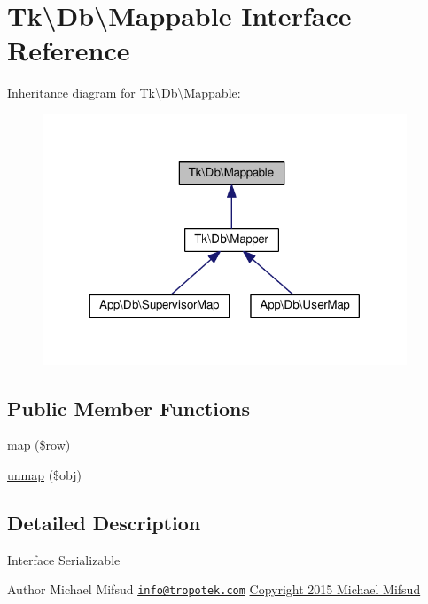 \hypertarget{interfaceTk_1_1Db_1_1Mappable}{\section{Tk\textbackslash{}Db\textbackslash{}Mappable Interface Reference}
\label{interfaceTk_1_1Db_1_1Mappable}
}


Inheritance diagram for Tk\textbackslash{}Db\textbackslash{}Mappable\+:\nopagebreak
\begin{figure}[H]
\begin{center}
\leavevmode
\includegraphics[width=308pt]{interfaceTk_1_1Db_1_1Mappable__inherit__graph}
\end{center}
\end{figure}
\subsection*{Public Member Functions}
\begin{DoxyCompactItemize}
\item 
\hyperlink{interfaceTk_1_1Db_1_1Mappable_adfad1228af636c25b6f70bccd2a2d667}{map} (\$row)
\item 
\hyperlink{interfaceTk_1_1Db_1_1Mappable_aa4b9d1ab4a8a76798a75b03eecd93de7}{unmap} (\$obj)
\end{DoxyCompactItemize}


\subsection{Detailed Description}
Interface Serializable

\begin{DoxyAuthor}{Author}
Michael Mifsud \href{mailto:info@tropotek.com}{\tt info@tropotek.\+com} \hyperlink{}{Copyright 2015 Michael Mifsud }
\end{DoxyAuthor}


